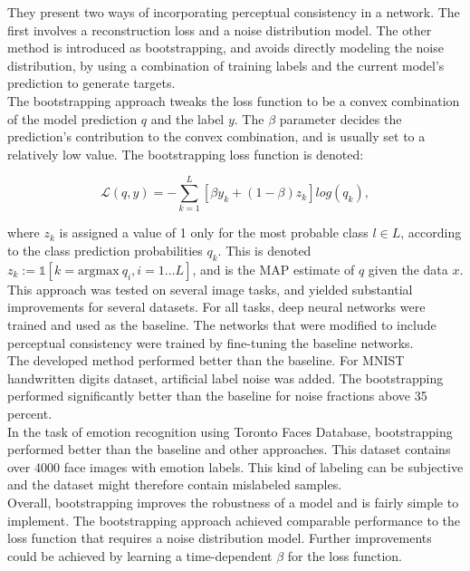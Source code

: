 They present two ways of incorporating perceptual consistency in a network. The first involves a reconstruction loss and a noise distribution model. The other method is introduced as bootstrapping, and avoids directly modeling the noise distribution, by using a combination of training labels and the current model's prediction to generate targets.\\

The bootstrapping approach tweaks the loss function to be a convex combination of the model prediction $q$ and the label $y$. The $\beta$ parameter decides the prediction's contribution to the convex combination, and is usually set to a relatively low value. The bootstrapping loss function is denoted:

$$\mathcal{L}(q,y) = - \sum\limits_{k=1}^L [\beta y_k + (1-\beta)z_k]log(q_k),$$

where $z_k$ is assigned a value of 1 only for the most probable class $l \in L$, according to the class prediction probabilities $q_k$. This is denoted $z_k := \mathbb{1}[k = \text{argmax}\ q_i, i=1\dots L]$, and is the \ac{MAP} estimate  of $q$ given the data $x$. \\

This approach was tested on several image tasks, and yielded substantial improvements for several datasets. For all tasks, deep neural networks were trained and used as the baseline. The networks that were modified to include perceptual consistency were trained by fine-tuning the baseline networks. \\

The developed method performed better than the baseline. For MNIST handwritten digits dataset, artificial label noise was added. The bootstrapping performed significantly better than the baseline for noise fractions above 35 percent.\\

In the task of emotion recognition using Toronto Faces Database, bootstrapping performed better than the baseline and other approaches. This dataset contains over 4000 face images with emotion labels. This kind of labeling can be subjective and the dataset might therefore contain mislabeled samples. \\

Overall, bootstrapping improves the robustness of a model and is fairly simple to implement. The bootstrapping approach achieved comparable performance to the loss function that requires a noise distribution model. Further improvements could be achieved by learning a time-dependent $\beta$ for the loss function.


